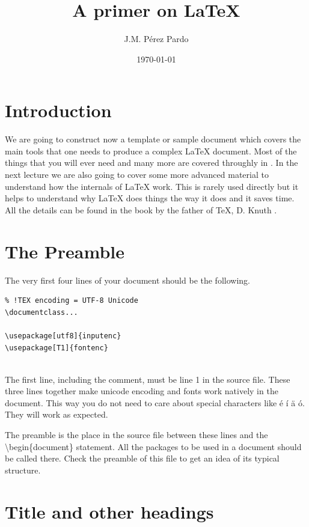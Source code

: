 \documentclass[a4paper]{article}
\author{J.M. Pérez Pardo} %
\title{A primer on \LaTeX} %
\date{\today} %
\newcommand{\bs}[1]{{\color{blue}\textbackslash{}#1}}
\begin{document}
\maketitle

\tableofcontents

\section{Introduction}

We are going to construct now a template or sample document which covers the main tools that one needs to produce a complex \LaTeX{} document. Most of the things that you will ever need and many more are covered throughly in \cite{MittelbachGoossens2004}. In the next lecture we are also going to cover some more advanced material to understand how the internals of \LaTeX{} work. This is rarely used directly but it helps to understand why \LaTeX{} does things the way it does and it saves time. All the details can be found in the book by the father of \TeX, D. Knuth \cite{Knuth1990}.

\section{The Preamble}

The very first four lines of your document should be the following. 

\begin{verbatim}
% !TEX encoding = UTF-8 Unicode
\documentclass...

\usepackage[utf8]{inputenc}
\usepackage[T1]{fontenc}


\end{verbatim}


The first line, including the comment, must be line 1 in the source file. These three lines together make unicode encoding and fonts work natively in the document. This way you do not need to care about special characters like é í ä ó. They will work as expected. 

The preamble is the place in the source file between these lines and the \bs{begin}\{document\} statement. All the packages to be used in a document should be called there. Check the preamble of this file to get an idea of its typical structure.

\section{Title and other headings}
\end{document}
